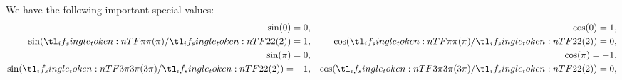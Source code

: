 \begin{proposition}\label{thm:trigonometric_function_basic_roots}
  We have the following important special values:
  \begin{align}
    \sin(0) = 0,                && \cos(0) = 1,               \label{eq:thm:trigonometric_function_basic_roots/zero} \\
    \sin(\ifrac \pi 2) = 1,     && \cos(\ifrac \pi 2) = 0,    \label{eq:thm:trigonometric_function_basic_roots/half_pi} \\
    \sin(\pi) = 0,              && \cos(\pi) = -1,            \label{eq:thm:trigonometric_function_basic_roots/pi} \\
    \sin(\ifrac {3\pi} 2) = -1, && \cos(\ifrac {3\pi} 2) = 0, \label{eq:thm:trigonometric_function_basic_roots/sesqui_pi}
  \end{align}
\end{proposition}
